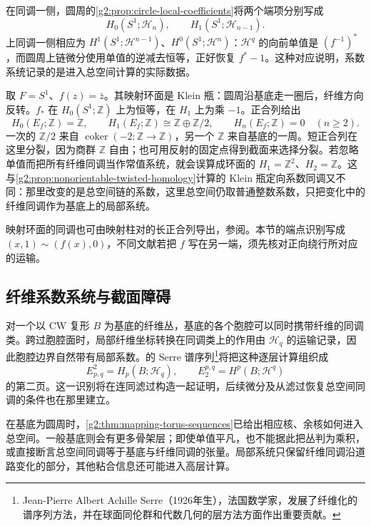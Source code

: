 在同调一侧，圆周的\cref{g2:prop:circle-local-coefficients}将两个端项分别写成
\[
	H_0(S^1;\mathcal H_n),\qquad H_1(S^1;\mathcal H_{n-1}).
\]
上同调一侧相应为 \(H^1(S^1;\mathcal H^{n-1})\)、\(H^0(S^1;\mathcal H^n)\)：\(\mathcal H^q\) 的向前单值是 \((f^{-1})^*\)，而圆周上链微分使用单值的逆减去恒等，正好恢复 \(f^*-1\)。这种对应说明，系数系统记录的是进入总空间计算的实际数据。

\begin{example}\label{g2:exm:klein-mapping-torus}
	取 \(F=S^1\)、\(f(z)=\bar z\)。其映射环面是 Klein 瓶：圆周沿基底走一圈后，纤维方向反转。\(f_*\) 在 \(H_0(S^1;\mathbb Z)\) 上为恒等，在 \(H_1\) 上为乘 \(-1\)。正合列给出
	\[
		H_0(E_f;\mathbb Z)=\mathbb Z,\qquad H_1(E_f;\mathbb Z)\cong\mathbb Z\oplus\mathbb Z/2,
		\qquad H_n(E_f;\mathbb Z)=0\quad(n\geq2).
	\]
	一次的 \(\mathbb Z/2\) 来自 \(\operatorname{coker}(-2:\mathbb Z\to\mathbb Z)\)，另一个 \(\mathbb Z\) 来自基底的一周。短正合列在这里分裂，因为商群 \(\mathbb Z\) 自由；也可用反射的固定点得到截面来选择分裂。若忽略单值而把所有纤维同调当作常值系统，就会误算成环面的 \(H_1=\mathbb Z^2\)、\(H_2=\mathbb Z\)。这与\cref{g2:prop:nonorientable-twisted-homology}计算的 Klein 瓶定向系数同调又不同：那里改变的是总空间链的系数，这里总空间仍取普通整数系数，只把变化中的纤维同调作为基底上的局部系统。
\end{example}

映射环面的同调也可由映射柱对的长正合列导出，参阅\cite[第2.2节，Mayer--Vietoris Sequences]{Hatcher2002}。本节的端点识别写成 \((x,1)\sim(f(x),0)\)，不同文献若把 \(f\) 写在另一端，须先核对正向绕行所对应的运输。

\subsection{纤维系数系统与截面障碍}
\label{g2:subsec:0504:03}
对一个以 CW 复形 \(B\) 为基底的纤维丛，基底的各个胞腔可以同时携带纤维的同调类。跨过胞腔面时，局部纤维坐标转换在同调类上的作用由 \(\mathcal H_q\) 的运输记录，因此胞腔边界自然带有局部系数。的 Serre 谱序列\footnote{Jean-Pierre Albert Achille Serre（1926年生），法国数学家，发展了纤维化的谱序列方法，并在球面同伦群和代数几何的层方法方面作出重要贡献。}将把这种逐层计算组织成
\[
	E^2_{p,q}=H_p(B;\mathcal H_q),\qquad E_2^{p,q}=H^p(B;\mathcal H^q)
\]
的第二页。这一识别将在连同滤过构造一起证明，后续微分及从滤过恢复总空间同调的条件也在那里建立。

\ProseParagraphBreak

在基底为圆周时，\cref{g2:thm:mapping-torus-sequences}已给出相应核、余核如何进入总空间。一般基底则会有更多骨架层；即使单值平凡，也不能据此把丛判为乘积，或直接断言总空间同调等于基底与纤维同调的张量。局部系统只保留纤维同调沿道路变化的部分，其他粘合信息还可能进入高层计算。

